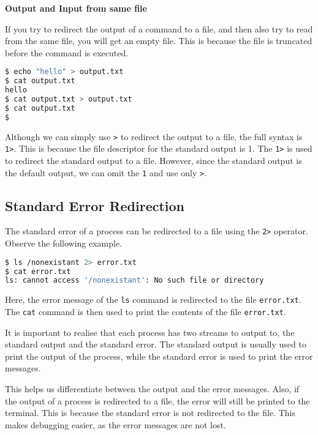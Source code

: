 \textbf{Output and Input from same file}

If you try to redirect the output of a command to a file, and then
also try to read from the same file, you will get an empty file.
This is because the file is truncated before the command is executed.

\begin{lstlisting}[language=bash]
$ echo "hello" > output.txt
$ cat output.txt
hello
$ cat output.txt > output.txt
$ cat output.txt
$
\end{lstlisting}

\begin{remark}
  Although we can simply use \texttt{>} to redirect the output to a file,
  the full syntax is \texttt{1>}. This is because the file descriptor
  for the standard output is 1. The \texttt{1>} is used to redirect
  the standard output to a file. However, since the standard output
  is the default output, we can omit the \texttt{1} and use only \texttt{>}.
\end{remark}

\subsection{Standard Error Redirection}

The standard error of a process can be redirected to a file using the
\texttt{2>} operator. Observe the following example.

\begin{lstlisting}[language=bash]
$ ls /nonexistant 2> error.txt
$ cat error.txt
ls: cannot access '/nonexistant': No such file or directory
\end{lstlisting}

Here, the error message of the \texttt{ls} command is redirected to the
file \texttt{error.txt}. The \texttt{cat} command is then used to print
the contents of the file \texttt{error.txt}.

It is important to realise that each process has two streams to output
to, the standard output and the standard error. The standard output is
usually used to print the output of the process, while the standard error
is used to print the error messages.

This helps us differentiate between the output and the error messages.
Also, if the output of a process is redirected to a file, the error
will still be printed to the terminal. This is because the standard
error is not redirected to the file. This makes debugging easier, as
the error messages are not lost.

